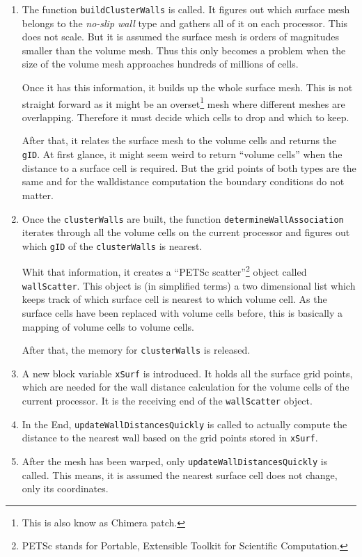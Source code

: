 \begin{enumerate}
  \item The function \texttt{buildClusterWalls} is called. It figures out which
surface mesh belongs to the \textit{no-slip wall} type and gathers all of it on
each processor. This does not scale. But it is assumed the surface mesh is
orders of magnitudes smaller than the volume mesh.  Thus this only becomes a
problem when the size of the volume mesh approaches hundreds of millions of
cells.

Once it has this information, it builds up the whole surface mesh. This is not
straight forward as it might be an overset\footnote{This is also know as Chimera
patch.} mesh where different meshes are overlapping. Therefore it must decide
which cells to drop and which to keep.

After that, it relates the surface mesh to the volume cells and returns the
\texttt{gID}. At first glance, it might seem weird to return ``volume cells''
when the distance to a surface cell is required. But the grid points of both
types are the same and for the walldistance computation the boundary conditions
do not matter.

  \item Once the \texttt{clusterWalls} are built, the function
\texttt{determineWallAssociation} iterates through all the volume cells on the
current processor and figures out which \texttt{gID} of the
\texttt{clusterWalls} is nearest.

Whit that information, it creates a ``PETSc scatter''\footnote{PETSc stands for
Portable, Extensible Toolkit for Scientific Computation.} object called
\texttt{wallScatter}. This object is (in simplified terms) a two dimensional
list which keeps track of which surface cell is nearest to which volume cell. As
the surface cells have been replaced with volume cells before, this is basically
a mapping of volume cells to volume cells.

After that, the memory for \texttt{clusterWalls} is released.

\item A new block variable \texttt{xSurf} is introduced. It holds all the
surface grid points, which are needed for the wall distance calculation for the
volume cells of the current processor. It is the receiving end of the
\texttt{wallScatter} object.

\item In the End, \texttt{updateWallDistancesQuickly} is called to actually
compute the distance to the nearest wall based on the grid points stored in
\texttt{xSurf}.

\item After the mesh has been warped, only \texttt{updateWallDistancesQuickly}
is called. This means, it is assumed the nearest surface cell does not
change, only its coordinates.
\end{enumerate}

